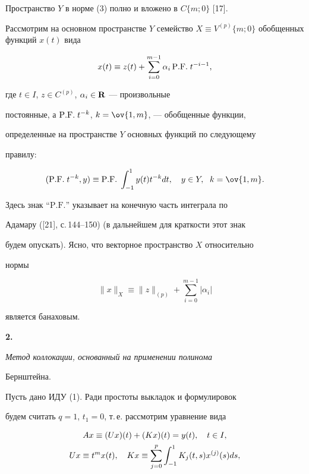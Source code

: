 Пространство $Y$ в норме (3) полно и вложено в $C\{m;0\}$ [17]. 


 


Рассмотрим на основном пространстве $Y$ семейство $X\equiv 


V^{(p)}\{m;0\}$ обобщенных функций $x(t)$ вида 


\begin{equation} 


x(t)\equiv z(t)+\sum^{m-1}_{i=0}\alpha_i\,\PF t^{-i-1}, 


\end{equation} 


где $t\in I$, $z\in C^{(p)}$, $\alpha_i\in\bold R$ --- произвольные 


постоянные, а $\mathrm{P.F.}\; t^{-k}$, $k=\ov{1,m}$, --- обобщенные функции, 


определенные на пространстве $Y$ основных функций по следующему 


правилу: 


$$ 


(\PF t^{-k},y)\equiv\PF\int^1_{-1}y(t)t^{-k}d t,\quad 


y\in Y,\ \; k=\ov{1,m}. 


$$ 


Здесь знак ``$\mathrm{P.F.}$'' указывает на конечную часть интеграла по 


Адамару ([21], с.\,144--150) (в дальнейшем для краткости этот знак 


будем опускать). Ясно, что векторное пространство $X$ относительно 


нормы 


$$ 


\|x\|_X\equiv\|z\|_{(p)}+\sum^{m-1}_{i=0}|\alpha_i| 


$$ 


является банаховым. 


\medskip 


 


{\bf 2.} {\it Метод коллокации, основанный на применении полинома 


Бернштейна.} Пусть дано ИДУ (1). Ради простоты выкладок и формулировок 


будем считать $q=1$, $t_1=0$, т.\,е. рассмотрим уравнение вида 


\begin{gather} 


Ax\equiv(U x)(t)+(K x)(t)=y(t),\quad t\in I,\\ 


U x\equiv t^m x(t),\quad K x\equiv\sum^p_{j=0} 


\int^1_{-1}K_j(t,s)x^{(j)}(s)d s,\notag 


\end{gather} 


